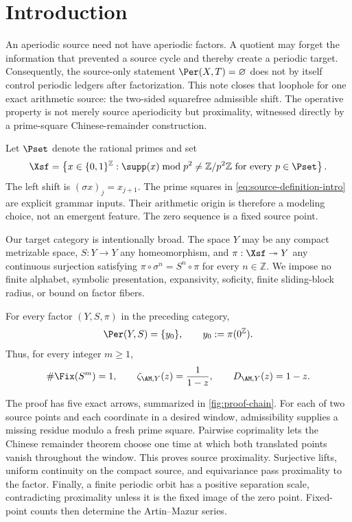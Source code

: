 \section{Introduction}
\label{sec:introduction}

An aperiodic source need not have aperiodic factors.  A quotient may forget
the information that prevented a source cycle and thereby create a periodic
target.  Consequently, the source-only statement
\(\Per(X,T)=\varnothing\) does not by itself control periodic ledgers after
factorization.  This note closes that loophole for one exact arithmetic
source: the two-sided squarefree admissible shift.  The operative property is
not merely source aperiodicity but proximality, witnessed directly by a
prime-square Chinese-remainder construction.

Let \(\Pset\) denote the rational primes and set
\begin{equation}
  \Xsf=
  \left\{x\in\{0,1\}^{\mathbb Z}:
  \supp(x)\bmod p^2\neq \mathbb Z/p^2\mathbb Z
  \text{ for every }p\in\Pset\right\}.
  \label{eq:source-definition-intro}
\end{equation}
The left shift is \((\sigma x)_j=x_{j+1}\).  The prime squares in
\cref{eq:source-definition-intro} are explicit grammar inputs.  Their
arithmetic origin is therefore a modeling choice, not an emergent feature.
The zero sequence is a fixed source point.

Our target category is intentionally broad.  The space \(Y\) may be any
compact metrizable space, \(S:Y\to Y\) any homeomorphism, and
\(\pi:\Xsf\twoheadrightarrow Y\) any continuous surjection satisfying
\(\pi\circ\sigma^n=S^n\circ\pi\) for every \(n\in\mathbb Z\).  We impose no
finite alphabet, symbolic presentation, expansivity, soficity, finite
sliding-block radius, or bound on factor fibers.

\begin{theorem}
\label{thm:intro-main}
For every factor \((Y,S,\pi)\) in the preceding category,
\[
  \Per(Y,S)=\{y_0\},
  \qquad y_0:=\pi(0^{\mathbb Z}).
\]
Thus, for every integer \(m\geq1\),
\[
  \#\Fix(S^m)=1,
  \qquad
  \zeta_{\AM,Y}(z)=\frac{1}{1-z},
  \qquad
  D_{\AM,Y}(z)=1-z.
\]
\end{theorem}

The proof has five exact arrows, summarized in
\cref{fig:proof-chain}.  For each of two source points and each coordinate in
a desired window, admissibility supplies a missing residue modulo a fresh
prime square.  Pairwise coprimality lets the Chinese remainder theorem choose
one time at which both translated points vanish throughout the window.  This
proves source proximality.  Surjective lifts, uniform continuity on the
compact source, and equivariance pass proximality to the factor.  Finally, a
finite periodic orbit has a positive separation scale, contradicting
proximality unless it is the fixed image of the zero point.  Fixed-point
counts then determine the Artin--Mazur series.

